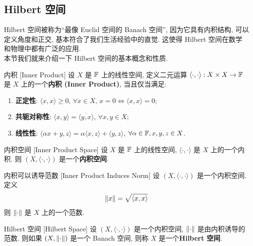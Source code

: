     \subsection{Hilbert 空间}

        \begin{intrormk}
            [Dedicatia]
            Hilbert 空间被称为``最像 Euclid 空间的 Banach 空间'', 因为它具有内积结构, 可以定义角度和正交, 基本符合了我们生活经验中的直觉. 这使得 Hilbert 空间在数学和物理中都有广泛的应用.\\
            本节我们就来介绍一下 Hilbert 空间的基本概念和性质.
        \end{intrormk}

        \begin{dfn}
            {内积}
            [Inner Product]
            设 \(X\) 是 \(\operatorname{\mathbb{F}}\) 上的线性空间, 定义二元运算 \(\langle\cdot,\cdot\rangle:X\times X\to\operatorname{\mathbb{F}}\) 是 \(X\) 上的一个\textbf{内积 (Inner Product)}, 当且仅当满足:
            \begin{enumerate}[label=(\roman*)]
                \item \textbf{正定性}: \(\langle x,x\rangle\geq 0\), \(\forall x\in X\),  \(x=0\iff \langle x,x\rangle=0\);
                \item \textbf{共轭对称性}: \(\langle x,y\rangle=\overline{\langle y,x\rangle}\), \(\forall x,y\in X\);
                \item \textbf{线性性}: \(\langle \alpha x+y,z\rangle=\alpha\langle x,z\rangle+\langle y,z\rangle\), \(\forall \alpha\in\operatorname{\mathbb{F}}, x,y,z\in X\).
            \end{enumerate}
        \end{dfn}

        \begin{dfn}
            [ips]
            {内积空间}
            [Inner Product Space]
            设 \(X\) 是 \(\operatorname{\mathbb{F}}\) 上的线性空间, \(\langle\cdot,\cdot\rangle\) 是 \(X\) 上的一个内积. 则 \((X, \langle\cdot,\cdot\rangle)\) 是一个\textbf{内积空间}.
        \end{dfn}

        \begin{ppt}
            {内积可以诱导范数}
            [Inner Product Induces Norm]
            设 \((X, \langle\cdot,\cdot\rangle)\) 是一个内积空间. 定义
            \[\norm{x}=\sqrt{\langle x,x\rangle}\]
            则 \(\norm{\cdot}\) 是 \(X\) 上的一个范数.
        \end{ppt}

        \begin{dfn}
            [hs]
            {Hilbert 空间}
            [Hilbert Space]
            设 \((X, \langle\cdot,\cdot\rangle)\) 是一个内积空间, \(\norm{\cdot}\) 是由内积诱导的范数. 则如果 \((X, \norm{\cdot})\) 是一个 Banach 空间, 则称 \(X\) 是一个\textbf{Hilbert 空间}.
        \end{dfn}

